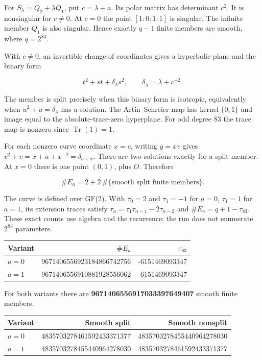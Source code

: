 \documentclass[
  10pt,
]{article}
\begin{document}
For \(S_\lambda=Q_2+\lambda Q_1\), put \(c=\lambda+a\). Its polar matrix
has determinant \(c^2\). It is nonsingular for \(c\ne0\). At \(c=0\) the
point \([1:0:1:1]\) is singular. The infinite member \(Q_1\) is also
singular. Hence exactly \(q-1\) finite members are smooth, where
\(q=2^{83}\).

With \(c\ne0\), an invertible change of coordinates gives a hyperbolic
plane and the binary form

\[t^2+st+\delta_\lambda s^2,\qquad
\delta_\lambda=\lambda+c^{-2}.\]

The member is split precisely when this binary form is isotropic,
equivalently when \(u^2+u=\delta_\lambda\) has a solution. The
Artin--Schreier map has kernel \(\{0,1\}\) and image equal to the
absolute-trace-zero hyperplane. For odd degree 83 the trace map is
nonzero since \(\operatorname{Tr}(1)=1\).

For each nonzero curve coordinate \(x=c\), writing \(y=xv\) gives
\(v^2+v=x+a+x^{-2}=\delta_{a+x}\). There are two solutions exactly for a
split member. At \(x=0\) there is one point \((0,1)\), plus \(O\).
Therefore

\[\#E_a=2+2\,\#\{\text{smooth split finite members}\}.\]

The curve is defined over GF(2). With \(\tau_0=2\) and \(\tau_1=-1\) for
\(a=0\), \(\tau_1=1\) for \(a=1\), its extension traces satisfy
\(\tau_n=\tau_1\tau_{n-1}-2\tau_{n-2}\) and \(\#E_a=q+1-\tau_{83}\).
These exact counts use algebra and the recurrence; the run does not
enumerate \(2^{83}\) parameters.

\begin{longtable}[]{@{}lrr@{}}
\toprule\noalign{}
Variant & \(\#E_a\) & \(\tau_{83}\) \\
\midrule\noalign{}
\endhead
\bottomrule\noalign{}
\endlastfoot
\(a=0\) & 9671406556923184866742756 & -6151469093347 \\
\(a=1\) & 9671406556910881928556062 & 6151469093347 \\
\end{longtable}

For both variants there are \textbf{9671406556917033397649407} smooth
finite members.

\begin{longtable}[]{@{}lrr@{}}
\toprule\noalign{}
Variant & Smooth split & Smooth nonsplit \\
\midrule\noalign{}
\endhead
\bottomrule\noalign{}
\endlastfoot
\(a=0\) & 4835703278461592433371377 & 4835703278455440964278030 \\
\(a=1\) & 4835703278455440964278030 & 4835703278461592433371377 \\
\end{longtable}
\end{document}
